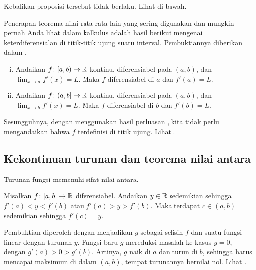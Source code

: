 Kebalikan proposisi tersebut tidak berlaku.  Lihat
 di bawah.

\medskip

Penerapan teorema nilai rata-rata lain yang sering digunakan dan mungkin pernah Anda
lihat dalam kalkulus adalah hasil berikut mengenai keterdiferensialan di
titik-titik ujung suatu interval.  Pembuktiannya diberikan dalam
.

\begin{prop} \label{prop:endpointderivative}
\leavevmode
\begin{enumerate}[(i)]
\item
Andaikan $f \colon [a,b) \to {\mathbb{R}}$ kontinu, diferensiabel pada $(a,b)$,
dan $\lim_{x \to a} f'(x) = L$.  Maka $f$ diferensiabel di $a$ dan
$f'(a) = L$.
\item
Andaikan $f \colon (a,b] \to {\mathbb{R}}$ kontinu, diferensiabel pada $(a,b)$,
dan $\lim_{x \to b} f'(x) = L$.  Maka $f$ diferensiabel di $b$ dan
$f'(b) = L$.
\end{enumerate}
\end{prop}

Sesungguhnya, dengan menggunakan hasil perluasan , kita tidak perlu mengandaikan
bahwa $f$ terdefinisi di titik ujung.  Lihat .

\subsection{Kekontinuan turunan dan teorema nilai antara}

Turunan fungsi memenuhi
sifat nilai antara.

\begin{thm}[Darboux] \label{thm:darboux} 
Misalkan $f \colon [a,b] \to {\mathbb{R}}$ diferensiabel.  Andaikan $y \in {\mathbb{R}}$ sedemikian
sehingga $f'(a) < y < f'(b)$ atau
$f'(a) > y > f'(b)$.  Maka terdapat $c \in (a,b)$ sedemikian sehingga $f'(c) =
y$.
\end{thm}

Pembuktian diperoleh dengan menjadikan $g$ sebagai selisih $f$
dan suatu fungsi linear dengan turunan $y$.
Fungsi baru $g$ mereduksi masalah
ke kasus $y=0$, dengan $g'(a) > 0 > g'(b)$.  Artinya, $g$ naik di $a$ dan
turun di $b$, sehingga harus mencapai maksimum di dalam $(a,b)$,
tempat turunannya bernilai nol.  Lihat .

\begin{myfigureht}
\caption{Gagasan pembuktian teorema Darboux.\label{darbouxthmfig}}
\end{myfigureht}

